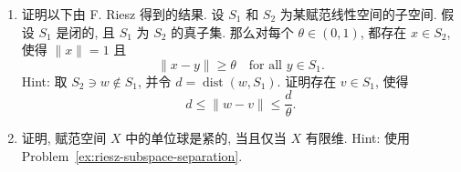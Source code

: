 \begin{enumerate}[label=\thesection.\arabic*.,ref=\thesection.\arabic*,start=39,series=book-problems]
\item\label{ex:riesz-subspace-separation} 证明以下由 F. Riesz 得到的结果. 设 $S_1$ 和 $S_2$ 为某赋范线性空间的子空间. 假设 $S_1$ 是闭的, 且 $S_1$ 为 $S_2$ 的真子集. 那么对每个 $\theta\in(0,1)$, 都存在 $x\in S_2$, 使得 $\|x\|=1$ 且
\begin{equation}\label{eq:riesz-subspace-separation-problem}
\|x-y\|\geq\theta\quad\text{for all }y\in S_1.
\end{equation}
Hint: 取 $S_2\ni w\notin S_1$, 并令 $d=\operatorname{dist}(w,S_1)$. 证明存在 $v\in S_1$, 使得
\begin{equation}\label{eq:riesz-subspace-separation-distance-hint}
d\leq\|w-v\|\leq\dfrac{d}{\theta}.
\end{equation}


\item\label{ex:infinite-dimensional-identity-noncompact} 证明, 赋范空间 $X$ 中的单位球是紧的, 当且仅当 $X$ 有限维. Hint: 使用 Problem~\ref{ex:riesz-subspace-separation}.

\end{enumerate}
